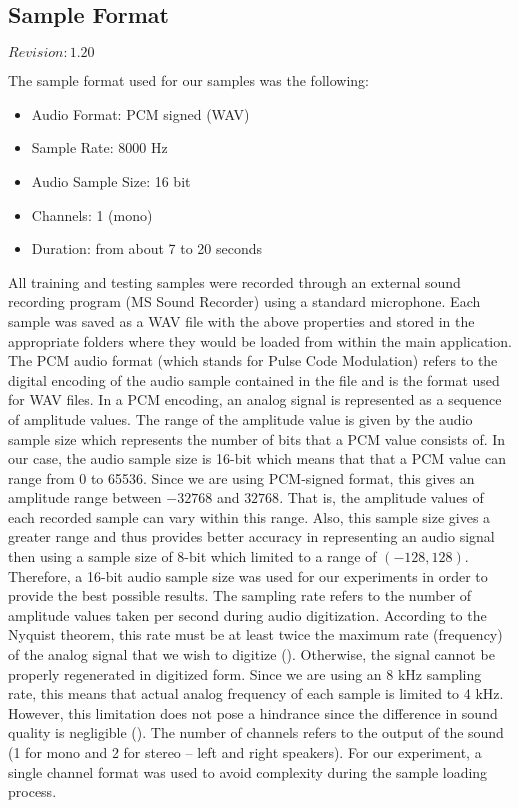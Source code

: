 \subsection{Sample Format}

$Revision: 1.20 $

The sample format used for our samples was the following:

\begin{itemize}
	\item Audio Format: PCM signed (WAV)
	\item Sample Rate: 8000 Hz
	\item Audio Sample Size: 16 bit
	\item Channels: 1 (mono)
	\item Duration: from about 7 to 20 seconds
\end{itemize}

All training and testing samples were recorded through an external sound recording
program (MS Sound Recorder) using a standard microphone. Each sample was
saved as a WAV file with the above properties and stored in the appropriate folders
where they would be loaded from within the main application. The PCM audio format
(which stands for Pulse Code Modulation) refers to the digital encoding of the audio
sample contained in the file and is the format used for WAV files. In a PCM
encoding, an analog signal is represented as a sequence of amplitude values. The
range of the amplitude value is given by the audio sample size which represents the
number of bits that a PCM value consists of. In our case, the audio sample size is
16-bit which means that that a PCM value can range from 0 to 65536. Since we are
using PCM-signed format, this gives an amplitude range between $-32768$ and $32768$.
That is, the amplitude values of each recorded sample can vary within this range.
Also, this sample size gives a greater range and thus provides better accuracy in
representing an audio signal then using a sample size of 8-bit which limited to a
range of $(-128, 128)$. Therefore, a 16-bit audio sample size was used for our
experiments in order to provide the best possible results. The sampling rate refers
to the number of amplitude values taken per second during audio digitization.
According to the Nyquist theorem, this rate must be at least twice the maximum rate
(frequency) of the analog signal that we wish to digitize (\cite{jervis}). Otherwise, the signal
cannot be properly regenerated in digitized form. Since we are using an 8 kHz
sampling rate, this means that actual analog frequency of each sample is limited to
4 kHz. However, this limitation does not pose a hindrance since the difference in
sound quality is negligible (\cite{shaughnessy2000}). The number of channels
refers to the output of the sound (1 for mono and 2 for stereo -- left and right
speakers). For our experiment, a single channel format was used to avoid complexity
during the sample loading process.

